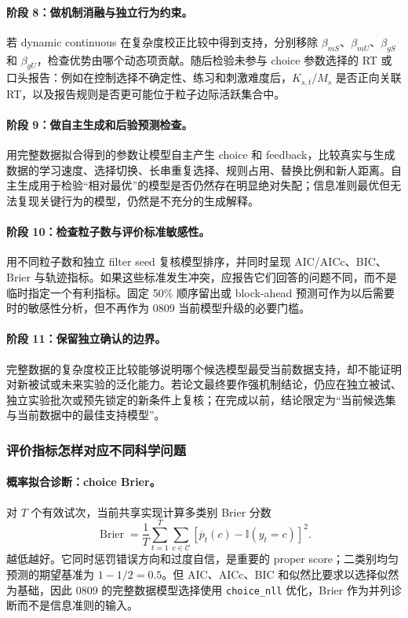 \paragraph{阶段 8：做机制消融与独立行为约束。}
若 dynamic continuous 在复杂度校正比较中得到支持，分别移除 $\beta_{mS}$、$\beta_{mU}$、$\beta_{gS}$ 和 $\beta_{gU}$，检查优势由哪个动态项贡献。随后检验未参与 choice 参数选择的 RT 或口头报告：例如在控制选择不确定性、练习和刺激难度后，$K_{s,t}/M_s$ 是否正向关联 RT，以及报告规则是否更可能位于粒子边际活跃集合中。

\paragraph{阶段 9：做自主生成和后验预测检查。}
用完整数据拟合得到的参数让模型自主产生 choice 和 feedback，比较真实与生成数据的学习速度、选择切换、长串重复选择、规则占用、替换比例和新人距离。自主生成用于检验“相对最优”的模型是否仍然存在明显绝对失配；信息准则最优但无法复现关键行为的模型，仍然是不充分的生成解释。

\paragraph{阶段 10：检查粒子数与评价标准敏感性。}
用不同粒子数和独立 filter seed 复核模型排序，并同时呈现 AIC/AICc、BIC、Brier 与轨迹指标。如果这些标准发生冲突，应报告它们回答的问题不同，而不是临时指定一个有利指标。固定 50\% 顺序留出或 block-ahead 预测可作为以后需要时的敏感性分析，但不再作为 0809 当前模型升级的必要门槛。

\paragraph{阶段 11：保留独立确认的边界。}
完整数据的复杂度校正比较能够说明哪个候选模型最受当前数据支持，却不能证明对新被试或未来实验的泛化能力。若论文最终要作强机制结论，仍应在独立被试、独立实验批次或预先锁定的新条件上复核；在完成以前，结论限定为“当前候选集与当前数据中的最佳支持模型”。


\subsubsection{评价指标怎样对应不同科学问题}

\paragraph{概率拟合诊断：choice Brier。}
对 $T$ 个有效试次，当前共享实现计算多类别 Brier 分数
\begin{equation}
\operatorname{Brier}
=\frac{1}{T}
\sum_{t=1}^{T}
\sum_{c\in\mathcal C}
\left[\overline p_t(c)-\mathbb I(y_t=c)\right]^2.
\label{eq:model0809-brier}
\end{equation}
越低越好。它同时惩罚错误方向和过度自信，是重要的 proper score；二类别均匀预测的期望基准为 $1-1/2=0.5$。但 AIC、AICc、BIC 和似然比要求以选择似然为基础，因此 0809 的完整数据模型选择使用 \texttt{choice\_nll} 优化，Brier 作为并列诊断而不是信息准则的输入。

